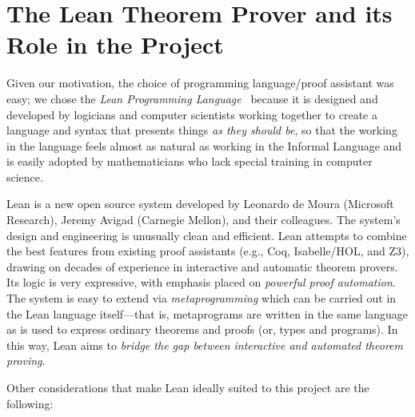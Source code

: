 \documentclass[11pt]{amsart}  %
\begin{document}





\section{The Lean Theorem Prover and its Role in the Project}
Given our motivation, the choice of programming language/proof assistant was easy; we chose the \emph{Lean Programming Language}~\cite{lean} because it is designed and developed by logicians and computer scientists working together to create a language and syntax that presents things \emph{as they should be}, so that the working in the language feels almost as natural as working in the Informal Language and is easily adopted by mathematicians who lack special training in computer science. 

Lean is a new open source system developed by Leonardo de Moura (Microsoft Research), Jeremy Avigad (Carnegie Mellon), and their colleagues. The system's design and engineering is unusually clean and efficient. Lean attempts to combine the best features from existing proof assistants (e.g., Coq, Isabelle/HOL, and Z3), drawing on decades of experience in interactive and automatic theorem provers. Its logic is very expressive, with emphasis placed on \emph{powerful proof automation}. The system is easy to extend via \emph{metaprogramming} which can be carried out in the Lean language itself---that is, metaprograms are written in the same language as is used to express ordinary theorems and proofs (or, types and programs). In this way, Lean aims to \emph{bridge the gap between interactive and automated theorem proving}.

Other considerations that make Lean ideally suited to this project are the following:
\end{document}
